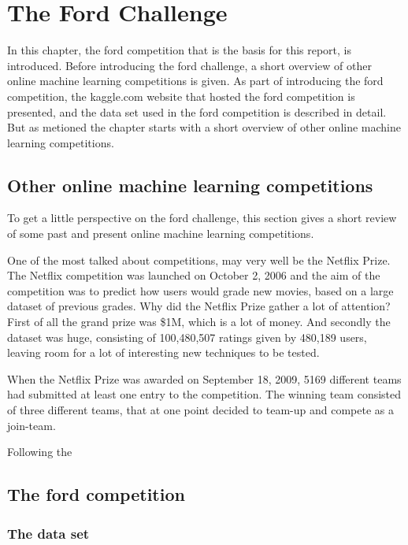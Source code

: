 \chapter{The Ford Challenge}
In this chapter, the ford competition that is the basis for this report, is introduced. Before introducing the ford challenge, a short overview of other online machine learning competitions is given. As part of introducing the ford competition, the kaggle.com website that hosted the ford competition is presented, and the data set used in the ford competition is described in detail. But as metioned the chapter starts with a short overview of other online machine learning competitions.

\section{Other online machine learning competitions}
To get a little perspective on the ford challenge, this section gives a short review of some past and present online machine learning competitions.\par
One of the most talked about competitions, may very well be the Netflix Prize. The Netflix competition was launched on October 2, 2006 and the aim of the competition was to predict how users would grade new movies, based on a large dataset of previous grades. Why did the Netflix Prize gather a lot of attention? First of all the grand prize was \$1M, which is a lot of money. And secondly the dataset was huge, consisting of 100,480,507 ratings given by 480,189 users, leaving room for a lot of interesting new techniques to be tested. \par
When the Netflix Prize was awarded on September 18, 2009, 5169 different teams had submitted at least one entry to the competition. The winning team consisted of three different teams, that at one point decided to team-up and compete as a join-team. \par
Following the 


\section{The ford competition}


\subsection{The data set}


